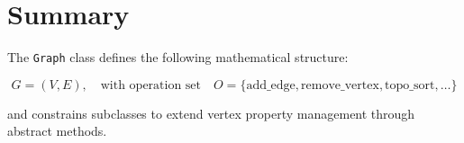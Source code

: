 \documentclass{article}
\begin{document}
\section*{Summary}

The \texttt{Graph} class defines the following mathematical structure:

\[
G = (V, E), \quad \text{with operation set} \quad O = \{\text{add\_edge}, \text{remove\_vertex}, \text{topo\_sort}, \dots \}
\]

and constrains subclasses to extend vertex property management through abstract methods.
\end{document}

